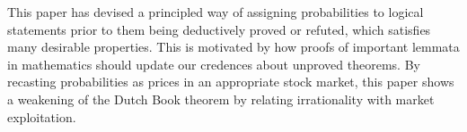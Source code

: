 \documentclass{article}
\begin{document}
This paper has devised a principled way of assigning probabilities to logical statements prior to them being deductively proved or refuted, which satisfies many desirable properties. This is motivated by how proofs of important lemmata in mathematics should update our credences about unproved theorems. By recasting probabilities as prices in an appropriate stock market, this paper shows a weakening of the Dutch Book theorem by relating irrationality with market exploitation.
\end{document}
